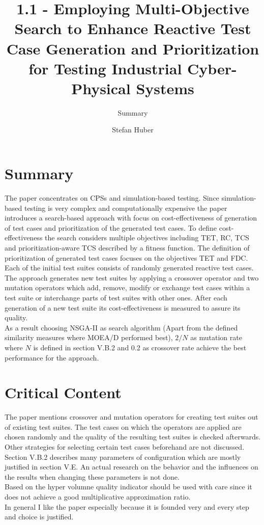 \documentclass[oneside, notitlepage, twocolumn]{scrartcl}
\title{\LARGE 1.1 - Employing Multi-Objective Search to Enhance Reactive Test Case Generation and Prioritization for Testing Industrial Cyber-Physical Systems}
\subtitle{Summary}
\author{Stefan Huber}
\begin{document}
\maketitle

\section{Summary}
The paper concentrates on \ac{CPS}s and simulation-based testing.
Since simulation-based testing is very complex and computationally expensive the paper introduces a search-based approach with focus on cost-effectiveness of generation of test cases and prioritization of the generated test cases.
To define cost-effectiveness the search considers multiple objectives including \ac{TET}, \ac{RC}, \ac{TCS} and prioritization-aware \ac{TCS} described by a fitness function.
The definition of prioritization of generated test cases focuses on the objectives \ac{TET} and \ac{FDC}.\\
Each of the initial test suites consists of randomly generated reactive test cases.
The approach generates new test suites  by applying a crossover operator and two mutation operators which add, remove, modify or exchange test cases within a test suite or interchange parts of test suites with other ones.
After each generation of a new test suite its cost-effectiveness is measured to assure its quality.\\
As a result choosing \ac{NSGA-II} as search algorithm (Apart from the defined similarity measures where \ac{MOEA/D} performed best), \(2/N\) as mutation rate where \(N\) is defined in section V.B.2 and 0.2 as crossover rate achieve the best performance for the approach.

\section{Critical Content}
The paper mentions crossover and mutation operators for creating test suites out of existing test suites.
The test cases on which the operators are applied are chosen randomly and the quality of the resulting test suites is checked afterwards.
Other strategies for selecting certain test cases beforehand are not discussed.\\
Section V.B.2 describes many parameters of configuration which are mostly justified in section V.E.
An actual research on the behavior and the influences on the results when changing these parameters is not done.\\
Based on \cite{bringmann13} the hyper volumne quality indicator should be used with care since it does not achieve a good multiplicative approximation ratio.\\
In general I like the paper especially because it is founded very and every step and choice is justified.
\end{document}
